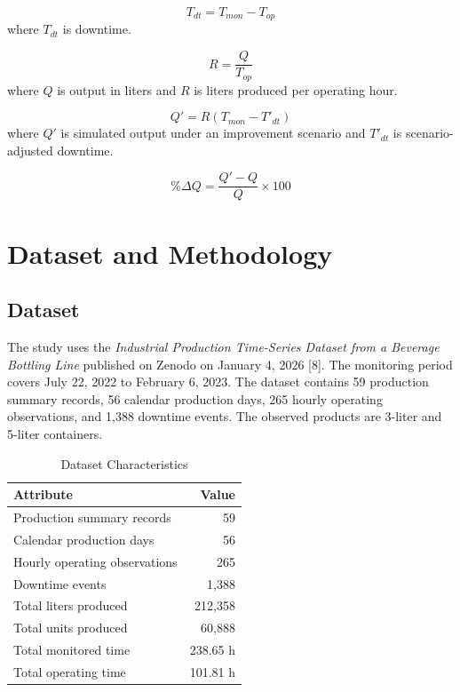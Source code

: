 \documentclass[conference]{IEEEtran}
\begin{document}
\begin{equation}
T_{dt} = T_{mon} - T_{op}
\end{equation}
where $T_{dt}$ is downtime.

\begin{equation}
R = \frac{Q}{T_{op}}
\end{equation}
where $Q$ is output in liters and $R$ is liters produced per operating hour.

\begin{equation}
Q' = R(T_{mon} - T'_{dt})
\end{equation}
where $Q'$ is simulated output under an improvement scenario and $T'_{dt}$ is scenario-adjusted downtime.

\begin{equation}
\%\Delta Q = \frac{Q' - Q}{Q} \times 100
\end{equation}

\section{Dataset and Methodology}
\subsection{Dataset}
The study uses the \emph{Industrial Production Time-Series Dataset from a Beverage Bottling Line} published on Zenodo on January 4, 2026 [8]. The monitoring period covers July 22, 2022 to February 6, 2023. The dataset contains 59 production summary records, 56 calendar production days, 265 hourly operating observations, and 1,388 downtime events. The observed products are 3-liter and 5-liter containers.

\begin{table}[!t]
\caption{Dataset Characteristics}
\centering
\begin{tabular}{lr}
\toprule
Attribute & Value \\
\midrule
Production summary records & 59 \\
Calendar production days & 56 \\
Hourly operating observations & 265 \\
Downtime events & 1,388 \\
Total liters produced & 212,358 \\
Total units produced & 60,888 \\
Total monitored time & 238.65 h \\
Total operating time & 101.81 h \\
\bottomrule
\end{tabular}
\end{table}
\end{document}
